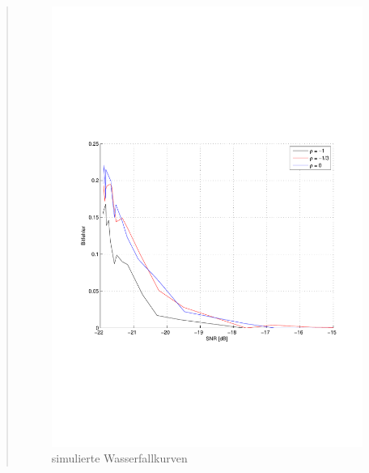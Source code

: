 \begin{quote}
       \begin{figure}[H]
        \centering
        \includegraphics[scale=0.7, trim = 2cm 7cm 1cm 8cm, clip]{Bilder/Simulation_Wasserfall}
          \caption{simulierte Wasserfallkurven}
        \label{fig:simu_Wasser}
       \end{figure}
       
       \vspace{2em}
    
\end{quote}


